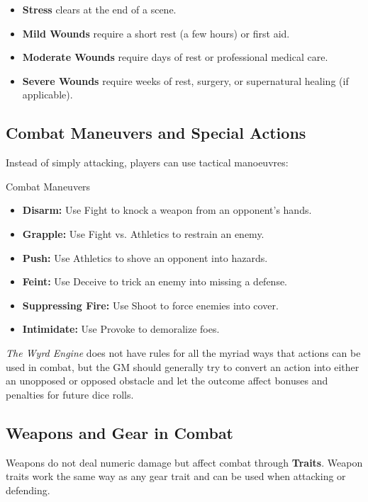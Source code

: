 \begin{itemize}
    \item \textbf{Stress} clears at the end of a scene.
    \item \textbf{Mild Wounds} require a short rest (a few hours) or first aid.
    \item \textbf{Moderate Wounds} require days of rest or professional medical care.
    \item \textbf{Severe Wounds} require weeks of rest, surgery, or supernatural healing (if applicable).
\end{itemize}

\subsection{Combat Maneuvers and Special Actions}
Instead of simply attacking, players can use tactical manoeuvres:

\begin{DndReadAloud}{Combat Maneuvers}
\begin{itemize}
    \item \textbf{Disarm:} Use Fight to knock a weapon from an opponent’s hands.
    \item \textbf{Grapple:} Use Fight vs. Athletics to restrain an enemy.
    \item \textbf{Push:} Use Athletics to shove an opponent into hazards.
    \item \textbf{Feint:} Use Deceive to trick an enemy into missing a defense.
    \item \textbf{Suppressing Fire:} Use Shoot to force enemies into cover.
    \item \textbf{Intimidate:} Use Provoke to demoralize foes.
\end{itemize}
\end{DndReadAloud}

\emph{The Wyrd Engine} does not have rules for all the myriad ways that actions can be used in combat, but the GM should generally try to convert an action into either an unopposed or opposed obstacle and let the outcome affect bonuses and penalties for future dice rolls.

\subsection{Weapons and Gear in Combat}
Weapons do not deal numeric damage but affect combat through \textbf{Traits}. Weapon traits work the same way as any gear trait and can be used when attacking or defending.

